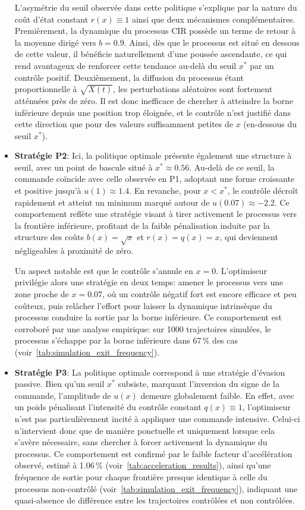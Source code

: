 \begin{itemize}
    L'asymétrie du seuil observée dans cette politique s'explique par la nature du coût d'état constant \(r(x)\equiv1\) ainsi que deux mécanismes complémentaires. Premièrement, la dynamique du processus \acs{CIR} possède un terme de retour à la moyenne dirigé vers \(b = 0.9\). Ainsi, dès que le processus est situé en dessous de cette valeur, il bénéficie naturellement d'une poussée ascendante, ce qui rend avantageux de renforcer cette tendance au-delà du seuil \(x^*\) par un contrôle positif. Deuxièmement, la diffusion du processus étant proportionnelle à \(\sqrt{X(t)}\), les perturbations aléatoires sont fortement atténuées près de zéro. Il est donc inefficace de chercher à atteindre la borne inférieure depuis une position trop éloignée, et le contrôle n'est justifié dans cette direction que pour des valeurs suffisamment petites de \(x\) (en-dessous du seuil $x^*$).
    \item \textbf{Stratégie P2}: Ici, la politique optimale présente également une structure à seuil, avec un point de bascule situé à \( x^* \approx 0.56 \). Au-delà de ce seuil, la commande coïncide avec celle observée en P1, adoptant une forme croissante et positive jusqu'à \(u(1)\approx1.4\). En revanche, pour \( x < x^* \), le contrôle décroît rapidement et atteint un minimum marqué autour de \( u(0.07) \approx -2.2 \). Ce comportement reflète une stratégie visant à tirer activement le processus vers la frontière inférieure, profitant de la faible pénalisation induite par la structure des coûts \( b(x) = \sqrt{x} \) et \( r(x) = q(x) = x \), qui deviennent négligeables à proximité de zéro.
    
    Un aspect notable est que le contrôle s'annule en \( x = 0 \). L'optimiseur privilégie alors une stratégie en deux temps: amener le processus vers une zone proche de \( x = 0.07 \), où un contrôle négatif fort est encore efficace et peu coûteux, puis relâcher l'effort pour laisser la dynamique intrinsèque du processus conduire la sortie par la borne inférieure. Ce comportement est corroboré par une analyse empirique: sur 1000 trajectoires simulées, le processus s'échappe par la borne inférieure dans 67\,\% des cas (voir~\ref{tab:simulation_exit_frequency}). 
    \item \textbf{Stratégie P3}: La politique optimale correspond à une stratégie d'évasion passive. Bien qu'un seuil \(x^*\) subsiste, marquant l'inversion du signe de la commande, l'amplitude de \(u(x)\) demeure globalement faible. En effet, avec un poids pénalisant l'intensité du contrôle constant \(q(x) \equiv 1\), l'optimiseur n'est pas particulièrement incité à appliquer une commande intensive. Celui-ci n'intervient donc que de manière ponctuelle et uniquement lorsque cela s'avère nécessaire, sans chercher à forcer activement la dynamique du processus. Ce comportement est confirmé par le faible facteur d'accélération observé, estimé à 1.06\,\% (voir~\ref{tab:acceleration_results}), ainsi qu'une fréquence de sortie pour chaque frontière presque identique à celle du processus non-contrôlé (voir~\ref{tab:simulation_exit_frequency}), indiquant une quasi-absence de différence entre les trajectoires contrôlées et non contrôlées.
\end{itemize}
